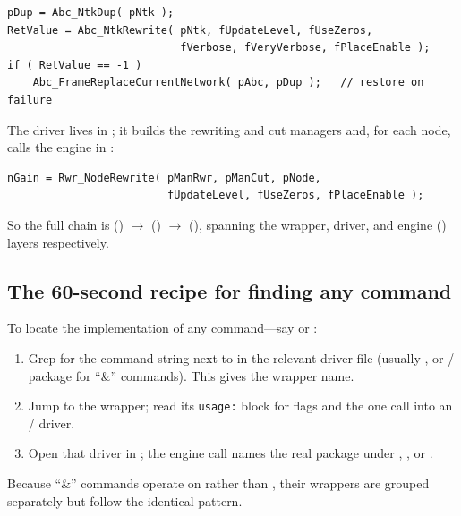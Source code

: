 \begin{lstlisting}[style=abccode]
pDup = Abc_NtkDup( pNtk );
RetValue = Abc_NtkRewrite( pNtk, fUpdateLevel, fUseZeros,
                           fVerbose, fVeryVerbose, fPlaceEnable );
if ( RetValue == -1 )
    Abc_FrameReplaceCurrentNetwork( pAbc, pDup );   // restore on failure
\end{lstlisting}

The driver  lives in
; it builds the rewriting and cut managers and,
for each node, calls the engine  in
:

\begin{lstlisting}[style=abccode]
nGain = Rwr_NodeRewrite( pManRwr, pManCut, pNode,
                         fUpdateLevel, fUseZeros, fPlaceEnable );
\end{lstlisting}

So the full chain is
 () $\to$
 () $\to$
 (), spanning the wrapper, driver, and
engine () layers respectively.

\subsection{The 60-second recipe for finding any command}

To locate the implementation of any command---say  or :

\begin{enumerate}
\item Grep for the command string next to  in the relevant
      driver file (usually , or  /
      package  for ``\&'' commands). This gives the wrapper name.
\item Jump to the  wrapper; read its \texttt{usage:} block
      for flags and the one call into an  / 
      driver.
\item Open that driver in ; the engine call names
      the real package under , , or .
\end{enumerate}

Because ``\&'' commands operate on  rather than ,
their wrappers are grouped separately but follow the identical pattern.

